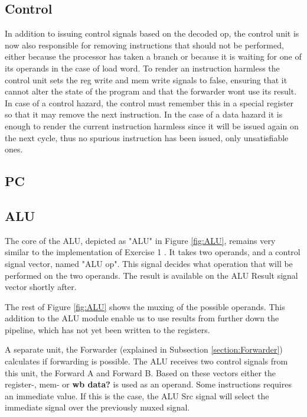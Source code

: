 \subsection{Control}
In addition to issuing control signals based on the decoded op, the control unit is now also responsible for removing instructions that should not be performed, either because the processor has taken a branch or because it is waiting for one of its operands in the case of load word.
To render an instruction harmless the control unit sets the reg write and mem write signals to false, ensuring that it cannot alter the state of the program and that the forwarder wont use its result.
In case of a control hazard, the control must remember this in a special register so that it may remove the next instruction. 
In the case of a data hazard it is enough to render the current instruction harmless since it will be issued again on the next cycle, thus no spurious instruction has been issued, only unsatisfiable ones.


\subsection{PC}

\subsection{ALU}
The core of the ALU, depicted as "ALU" in Figure \ref{fig:ALU}, remains very similar to the implementation of Exercise 1 \cite{ex1report}. It takes two operands, and a control signal vector, named "ALU op". This signal decides what operation that will be performed on the two operands. The result is available on the ALU Result signal vector shortly after.

The rest of Figure \ref{fig:ALU} shows the muxing of the possible operands. This addition to the ALU module enable us to use results from further down the pipeline, which has not yet been written to the registers.

A separate unit, the Forwarder (explained in Subsection \ref{section:Forwarder}) calculates if forwarding is possible.
The ALU receives two control signals from this unit, the Forward A and Forward B.
Based on these vectors either the register-, mem- or \textbf{wb data?} is used as an operand.
Some instructions requires an immediate value. If this is the case, the ALU Src signal will select the immediate signal over the previously muxed signal.

